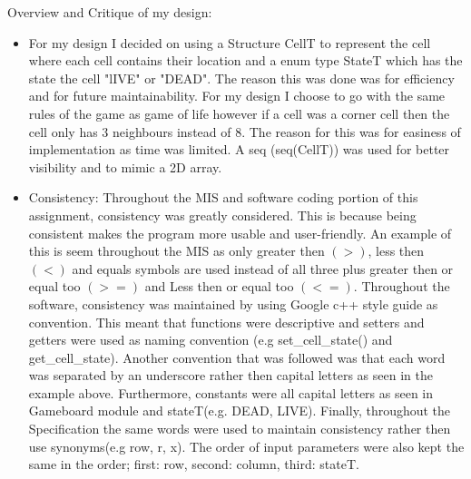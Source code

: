\documentclass[12pt]{article}
\begin{document}
\newpage

Overview and Critique of my design:\\

\begin{itemize}
\item For my design I decided on using a Structure CellT to represent the cell where each cell contains their location and a enum type StateT which has the state the cell "lIVE" or "DEAD". The reason this was done was for efficiency and for future maintainability. For my design I choose to go with the same rules of the game as game of life however if a cell was a corner cell then the cell only has 3 neighbours instead of 8. The reason for this was for easiness of implementation as time was limited. A seq (seq(CellT)) was used for better visibility and to mimic a 2D array.



\item Consistency: Throughout the MIS and software coding portion of this assignment, consistency was greatly considered. This is because being consistent makes the program more usable and user-friendly. An example of this is seem throughout the MIS as only greater then $(>)$, less then $(<)$ and equals symbols are used instead of all three plus greater then or equal too $(>=)$ and Less then or equal too $(<=)$. Throughout the software, consistency was maintained by using Google c++ style guide as convention. This meant that functions were descriptive and setters and getters were used as naming convention (e.g set\_cell\_state() and get\_cell\_state). Another convention that was followed was that each word was separated by an underscore rather then capital letters as seen in the example above. Furthermore, constants were all capital letters as seen in Gameboard module and stateT(e.g. DEAD, LIVE). Finally, throughout the Specification the same words were used to maintain consistency rather then use synonyms(e.g row, r, x). The order of input parameters were also kept the same in the order; first: row, second: column, third: stateT.\\


\end{itemize}
\end{document}
